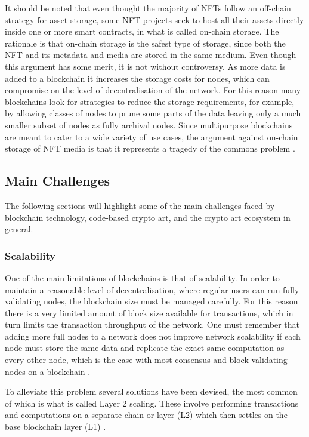 It should be noted that even thought the majority of NFTs follow an off-chain strategy for asset storage, some NFT projects seek to host all their assets directly inside one or more smart contracts, in what is called on-chain storage. The rationale is that on-chain storage is the safest type of storage, since both the NFT and its metadata and media are stored in the same medium. Even though this argument has some merit, it is not without controversy. As more data is added to a blockchain it increases the storage costs for nodes, which can compromise on the level of decentralisation of the network. For this reason many blockchains look for strategies to reduce the storage requirements, for example, by allowing classes of nodes to prune some parts of the data leaving only a much smaller subset of nodes as fully archival nodes. Since multipurpose blockchains are meant to cater to a wide variety of use cases, the argument against on-chain storage of NFT media is that it represents a tragedy of the commons problem \cite{hardinTragedyCommonsPopulation1968}.


\subsection{Main Challenges}

The following sections will highlight some of the main challenges faced by blockchain technology, code-based crypto art, and the crypto art ecosystem in general.

\subsubsection{Scalability}

One of the main limitations of blockchains is that of scalability. In order to maintain a reasonable level of decentralisation, where regular users can run fully validating nodes, the blockchain size must be managed carefully. For this reason there is a very limited amount of block size available for transactions, which in turn limits the transaction throughput of the network. One must remember that adding more full nodes to a network does not improve network scalability if each node must store the same data and replicate the exact same computation as every other node, which is the case with most consensus and block validating nodes on a blockchain \cite{khanSystematicLiteratureReview2021}.

To alleviate this problem several solutions have been devised, the most common of which is what is called Layer 2 scaling. These involve performing transactions and computations on a separate chain or layer (L2) which then settles on the base blockchain layer (L1) \cite{zhouSolutionsScalabilityBlockchain2020}.


